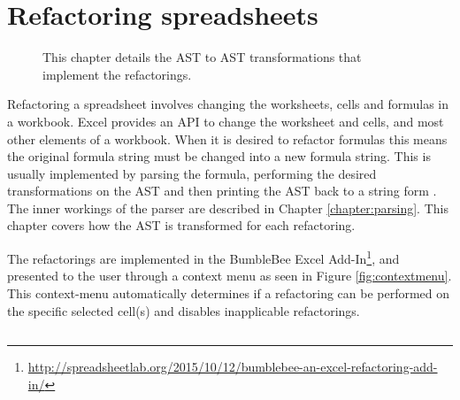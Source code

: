 
\chapter{Refactoring spreadsheets}
\label{chapter:implementingrefactorings}

\noindent
\begin{figure}[h!]
\hspace*{0.003\textwidth}

\caption{This chapter details the AST to AST transformations that implement the refactorings.}
\end{figure}

Refactoring a spreadsheet involves changing the worksheets, cells and formulas in a workbook.
Excel provides an API to change the worksheet and cells, and most other elements of a workbook.
When it is desired to refactor formulas this means the original formula string must be changed into a new formula string.
This is usually implemented by parsing the formula, performing the desired transformations on the AST and then printing the AST back to a string form \cite{fowler1999refactoring}.
The inner workings of the parser are described in Chapter \ref{chapter:parsing}.
This chapter covers how the AST is transformed for each refactoring.

The refactorings are implemented in the BumbleBee Excel Add-In\footnote{\url{http://spreadsheetlab.org/2015/10/12/bumblebee-an-excel-refactoring-add-in/}}, and presented to the user through a context menu as seen in Figure \ref{fig:contextmenu}.
This context-menu automatically determines if a refactoring can be performed on the specific selected cell(s) and disables inapplicable refactorings.


\newpage

\section{}
\label{refac:extractformula}

